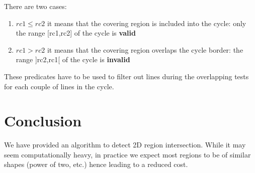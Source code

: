 \documentclass[twocolumn]{article}
\begin{document}
There are two cases:
\begin{enumerate}
   \item $rc1 \le rc2$ it means that the covering region is included into the cycle:
   only the range [rc1,rc2] of the cycle is \textbf{valid}
   \item $rc1 > rc2$ it means that the covering region overlaps the cycle border:
   the range ]rc2,rc1[ of the cycle is \textbf{invalid}
\end{enumerate}

These predicates have to be used to filter out lines during the overlapping
tests for each couple of lines in the cycle.


\section{Conclusion}

We have provided an algorithm to detect 2D region intersection. While it may
seem computationally heavy, in practice we expect most regions to be of similar
shapes (power of two, etc.) hence leading to a reduced cost.
\end{document}
